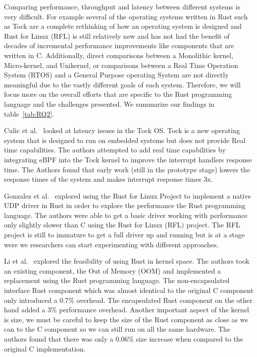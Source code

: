 \documentclass[sigconf,review,anonymous]{acmart}
\begin{document}
Comparing performance, throughput and latency between different systems is very difficult. For
example several of the operating systems written in Rust such as Tock are a complete rethinking of
how an operating system is designed and Rust for Linux (RFL) is still relatively new and has not had
the benefit of decades of incremental performance improvements like components that are written in
C. Additionally, direct comparisons between a Monolithic kernel, Micro-kernel, and Unikernel, or
comparisons between a Real Time Operation System (RTOS) and a General Purpose operating System are
not directly meaningful due to the vastly different goals of each system. Therefore, we will focus
more on the overall efforts that are specific to the Rust programming language and the challenges
presented. We summarize our findings in table~\ref{tab:RQ2}.

Culic et al.~\cite{Culic2022-bk} looked at latency issues in the Tock OS. Tock is a new operating
system that is designed to run on embedded systems but does not provide Real time capabilities. The
authors attempted to add real time capabilities by integrating eBPF into the Tock kernel to improve
the interrupt handlers response time. The Authors found that early work (still in the prototype
stage) lowers the response times of the system and makes interrupt response times 3x.

Gonzalez et al.~\cite{Gonzalez2023-ek} explored using the Rust for Linux Project to implement a
native UDP driver in Rust in order to explore the performance the Rust programming language. The
authors were able to get a basic driver working with performance only slightly slower than C using
the Rust for Linux (RFL) project. The RFL project is still to immature to get a full driver up and
running but is at a stage were we researchers can start experimenting with different approaches.

Li et al.~\cite{Li2024-be} explored the feasibility of using Rust in kernel space. The authors took
an existing component, the Out of Memory (OOM) and implemented a replacement using the Rust
programming language. The non-encapsulated interface Rust component which was almost identical to
the original C component only introduced a 0.7\% overhead. The encapsulated Rust component on the
other hand added a 3\% performance overhead. Another important aspect of the kernel is size, we must
be careful to keep the size of the Rust component as close as we can to the C component so we can
still run on all the same hardware. The authors found that there was only a 0.06\% size increase
when compared to the original C implementation.
\end{document}
